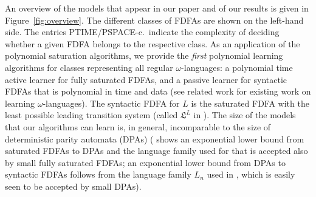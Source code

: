 \documentclass[a4paper,USenglish,cleveref,autoref,thm-restate]{lipics-v2021}
\newcommand{\PSPACE}{\textsf{PSPACE}\xspace}
\newcommand{\PTIME}{\textsf{PTIME}\xspace}
\begin{document}
An overview of the models that appear in our paper and of our results is given in Figure~\ref{fig:overview}. The different classes of FDFAs are shown on the left-hand side. The entries \PTIME/\PSPACE-c.\ indicate the complexity of deciding whether a given FDFA belongs to the respective class. As an application of the polynomial saturation algorithms, we provide the \emph{first} polynomial learning algorithms for classes representing all regular $\omega$-languages: a polynomial time active learner for fully saturated FDFAs, and a passive learner for syntactic FDFAs that is polynomial in time and data (see related work for existing work on learning $\omega$-languages). The syntactic FDFA for $L$ is the saturated FDFA with the least possible leading transition system (called $\mathfrak{L}^L$ in \cite{Klarlund94}). 
The size of the models that our algorithms can learn is, in general, incomparable to the size of deterministic parity automata (DPAs) (\cite[Theorem~5.12]{AngluinBF18} shows an exponential lower bound from saturated FDFAs to DPAs and the language family used for that is accepted also by small fully saturated FDFAs; an exponential lower bound from DPAs to syntactic FDFAs follows from the language family $L_n$ used in  , which is easily seen to be accepted by small DPAs).
\end{document}
